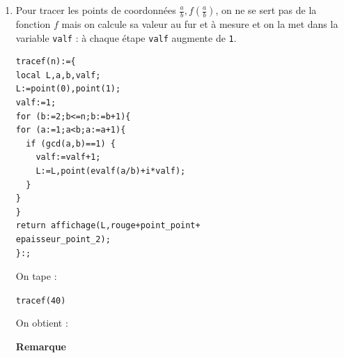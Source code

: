 \documentclass[a4paper,11pt]{book}
\begin{document}
\begin{enumerate}
{\tt 1+sum(euler(k),k=0..29)} et on obtient bien {\tt 271}\\
On tape :
\begin{center}{\tt f(13,30)}\end{center}
On obtient {\tt f(13/30)} :
\begin{center}{\tt 274}\end{center}
On tape :
\begin{center}{\tt f(29,30)}\end{center}
On obtient {\tt f(29/30)} :
\begin{center}{\tt 278}\end{center}
On v\'erifie en tapant :\\
{\tt sum(euler(k),k=0..30)} et on obtient bien {\tt 278}\\
On tape :
\begin{center}{\tt f(31,32)}\end{center}
On obtient {\tt f(31/32)}:
\begin{center}{\tt 324}\end{center}
On tape :
\begin{center}{\tt f(39,40)}\end{center}
On obtient :
\begin{center}{\tt 490}\end{center}
\item Pour tracer les points 
de coordonn\'ees $\frac{a}{b},f(\frac{a}{b})$,
on ne se sert pas de la fonction $f$ mais on calcule sa valeur au fur et \`a 
mesure et on la met  dans la variable {\tt  valf} : \`a chaque \'etape 
{\tt valf} augmente de {\tt  1}.
\begin{verbatim}
tracef(n):={
local L,a,b,valf;
L:=point(0),point(1);
valf:=1;
for (b:=2;b<=n;b:=b+1){
for (a:=1;a<b;a:=a+1){
  if (gcd(a,b)==1) {
    valf:=valf+1;
    L:=L,point(evalf(a/b)+i*valf);
  }
}
}
return affichage(L,rouge+point_point+
epaisseur_point_2);
}:;
\end{verbatim}
On tape :
\begin{center}{\tt tracef(40)}\end{center}
On obtient :
\begin{center}\end{center}{\bf Remarque}

\end{enumerate}
\end{document}
